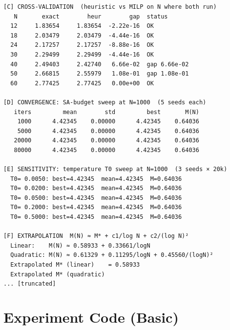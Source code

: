 \documentclass[11pt]{article}
\begin{document}
\begin{lstlisting}
[C] CROSS-VALIDATION  (heuristic vs MILP on N where both run)
   N       exact        heur        gap  status
  12     1.83654     1.83654  -2.22e-16  OK
  18     2.03479     2.03479  -4.44e-16  OK
  24     2.17257     2.17257  -8.88e-16  OK
  30     2.29499     2.29499  -4.44e-16  OK
  40     2.49403     2.42740   6.66e-02  gap 6.66e-02
  50     2.66815     2.55979   1.08e-01  gap 1.08e-01
  60     2.77425     2.77425   0.00e+00  OK

[D] CONVERGENCE: SA-budget sweep at N=1000  (5 seeds each)
   iters         mean        std         best       M(N)
    1000      4.42345    0.00000      4.42345    0.64036
    5000      4.42345    0.00000      4.42345    0.64036
   20000      4.42345    0.00000      4.42345    0.64036
   80000      4.42345    0.00000      4.42345    0.64036

[E] SENSITIVITY: temperature T0 sweep at N=1000  (3 seeds × 20k)
  T0= 0.0050: best=4.42345  mean=4.42345  M=0.64036
  T0= 0.0200: best=4.42345  mean=4.42345  M=0.64036
  T0= 0.0500: best=4.42345  mean=4.42345  M=0.64036
  T0= 0.2000: best=4.42345  mean=4.42345  M=0.64036
  T0= 0.5000: best=4.42345  mean=4.42345  M=0.64036

[F] EXTRAPOLATION  M(N) ≈ M* + c1/log N + c2/(log N)²
  Linear:    M(N) ≈ 0.58933 + 0.33661/logN
  Quadratic: M(N) ≈ 0.61329 + 0.11295/logN + 0.45560/(logN)²
  Extrapolated M* (linear)    = 0.58933
  Extrapolated M* (quadratic) 
... [truncated]
\end{lstlisting}


\section{Experiment Code (Basic)}
\end{document}
